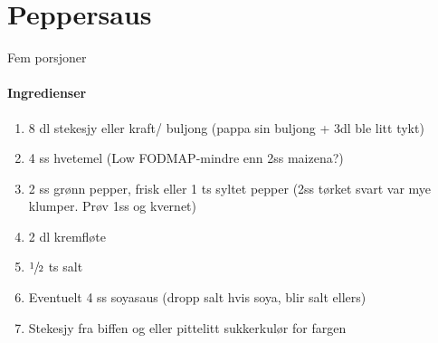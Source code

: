 \section{﻿Peppersaus}
\label{peppersaus}
Fem porsjoner

\paragraph{Ingredienser}
\begin{enumerate}[noitemsep]
  \item 8 dl stekesjy eller kraft/ buljong (pappa sin buljong + 3dl ble litt tykt)
  \item 4 ss hvetemel (Low FODMAP-mindre enn 2ss maizena?)
  \item 2 ss grønn pepper, frisk eller 1 ts syltet pepper (2ss tørket svart var mye klumper.  Prøv 1ss og kvernet)
  \item 2 dl kremfløte
  \item  $\sfrac{1}{2}$  ts salt
  \item Eventuelt 4 ss soyasaus (dropp salt hvis soya, blir salt ellers)
  \item Stekesjy fra biffen og eller pittelitt sukkerkulør for fargen
\end{enumerate}
